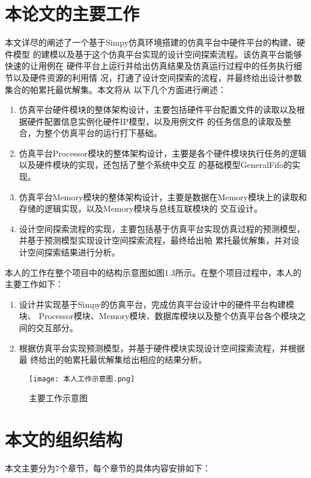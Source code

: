 \section{本论文的主要工作}
本文详尽的阐述了一个基于Simpy仿真环境搭建的仿真平台中硬件平台的构建、硬件模型
的建模以及基于这个仿真平台实现的设计空间探索流程。该仿真平台能够快速的让用例在
硬件平台上运行并给出仿真结果及仿真运行过程中的任务执行细节以及硬件资源的利用情
况，打通了设计空间探索的流程，并最终给出设计参数集合的帕累托最优解集。本文将从
以下几个方面进行阐述：

\begin{enumerate}
    \item 仿真平台硬件模块的整体架构设计，主要包括硬件平台配置文件的读取以及根据硬件配置信息实例化硬件IP模型，以及用例文件
    的任务信息的读取及整合，为整个仿真平台的运行打下基础。
    \item 仿真平台Processor模块的整体架构设计，主要是各个硬件模块执行任务的逻辑以及硬件模块的实现，还包括了整个系统中交互
    的基础模型GeneralFifo的实现。
    \item 仿真平台Memory模块的整体架构设计，主要是数据在Memory模块上的读取和存储的逻辑实现，以及Memory模块与总线互联模块的
    交互设计。
    \item 设计空间探索流程的实现，主要包括基于仿真平台实现仿真过程的预测模型，并基于预测模型实现设计空间探索流程，最终给出帕
    累托最优解集，并对设计空间探索结果进行分析。
\end{enumerate}

本人的工作在整个项目中的结构示意图如图1.3所示。在整个项目过程中，本人的主要工作如下：

\begin{enumerate}
    \item 设计并实现基于Simpy的仿真平台，完成仿真平台设计中的硬件平台构建模块、
    Processor模块、Memory模块、数据库模块以及整个仿真平台各个模块之间的交互部分。
    \item 根据仿真平台实现预测模型，并基于硬件模块实现设计空间探索流程，并根据最
    终给出的帕累托最优解集给出相应的结果分析。
\end{enumerate}

\begin{figure}
    \centering
    \texttt{[image: 本人工作示意图.png]}
    \caption{主要工作示意图}
    \label{fig:badge}
\end{figure}


\section{本文的组织结构}
本文主要分为7个章节，每个章节的具体内容安排如下：

